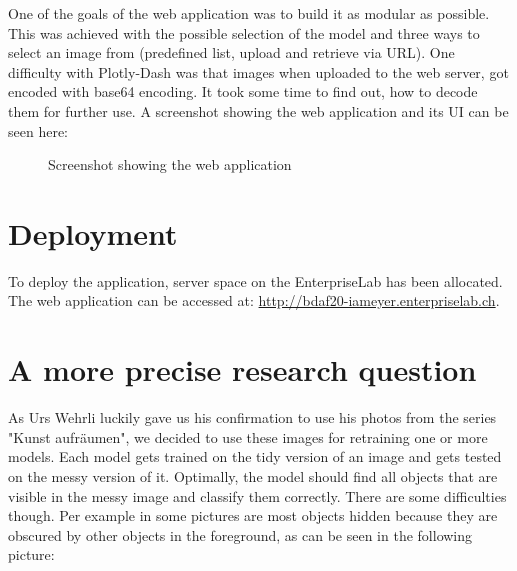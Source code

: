One of the goals of the web application was to build it as modular as possible. This was achieved with the possible selection of the model and three ways to select an image from (predefined list, upload and retrieve via URL). One difficulty with Plotly-Dash was that images when uploaded to the web server, got encoded with base64 encoding. It took some time to find out, how to decode them for further use. A screenshot showing the web application and its UI can be seen here:

 \begin{figure}[H]
	\caption{\label{fig:web-app-ui} Screenshot showing the web application}
\end{figure}

\section{Deployment}

To deploy the application, server space on the EnterpriseLab has been allocated. The web application can be accessed at: \url{http://bdaf20-iameyer.enterpriselab.ch}.

\section{A more precise research question}

As Urs Wehrli luckily gave us his confirmation to use his photos from the series "Kunst aufräumen", we decided to use these images for retraining one or more models. Each model gets trained on the tidy version of an image and gets tested on the messy version of it. Optimally, the model should find all objects that are visible in the messy image and classify them correctly. There are some difficulties though. Per example in some pictures are most objects hidden because they are obscured by other objects in the foreground, as can be seen in the following picture:

